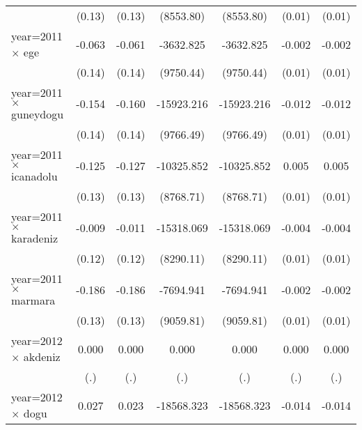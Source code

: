 {\begin{tabular}{l*{6}{c}}
                    &      (0.13)         &      (0.13)         &   (8553.80)         &   (8553.80)         &      (0.01)         &      (0.01)         \\
year=2011 $\times$ ege&      -0.063         &      -0.061         &   -3632.825         &   -3632.825         &      -0.002         &      -0.002         \\
                    &      (0.14)         &      (0.14)         &   (9750.44)         &   (9750.44)         &      (0.01)         &      (0.01)         \\
year=2011 $\times$ guneydogu&      -0.154         &      -0.160         &  -15923.216         &  -15923.216         &      -0.012         &      -0.012         \\
                    &      (0.14)         &      (0.14)         &   (9766.49)         &   (9766.49)         &      (0.01)         &      (0.01)         \\
year=2011 $\times$ icanadolu&      -0.125         &      -0.127         &  -10325.852         &  -10325.852         &       0.005         &       0.005         \\
                    &      (0.13)         &      (0.13)         &   (8768.71)         &   (8768.71)         &      (0.01)         &      (0.01)         \\
year=2011 $\times$ karadeniz&      -0.009         &      -0.011         &  -15318.069         &  -15318.069         &      -0.004         &      -0.004         \\
                    &      (0.12)         &      (0.12)         &   (8290.11)         &   (8290.11)         &      (0.01)         &      (0.01)         \\
year=2011 $\times$ marmara&      -0.186         &      -0.186         &   -7694.941         &   -7694.941         &      -0.002         &      -0.002         \\
                    &      (0.13)         &      (0.13)         &   (9059.81)         &   (9059.81)         &      (0.01)         &      (0.01)         \\
year=2012 $\times$ akdeniz&       0.000         &       0.000         &       0.000         &       0.000         &       0.000         &       0.000         \\
                    &         (.)         &         (.)         &         (.)         &         (.)         &         (.)         &         (.)         \\
year=2012 $\times$ dogu&       0.027         &       0.023         &  -18568.323\sym{*}  &  -18568.323\sym{*}  &      -0.014         &      -0.014         \\

\end{tabular}}
